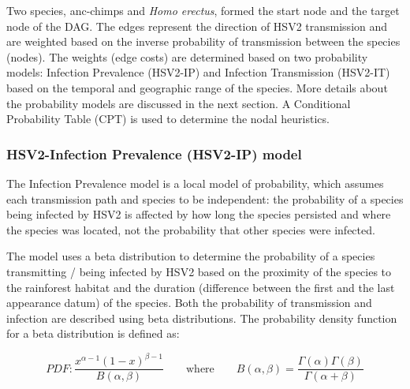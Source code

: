 \documentclass[fleqn,10pt]{wlscirep}
\begin{document}
Two species, anc-chimps and \textit{Homo erectus}, formed the start node and the target node of the DAG. The edges represent the direction of HSV2 transmission and are weighted based on the inverse probability of transmission between the species (nodes). The weights (edge costs) are determined based on two probability models: Infection Prevalence (HSV2-IP) and Infection Transmission (HSV2-IT) based on the temporal and geographic range of the species. More details about the probability models are discussed in the next section. A Conditional Probability Table (CPT) is used to determine the nodal heuristics.
 

\subsubsection*{HSV2-Infection Prevalence (HSV2-IP) model}
The Infection Prevalence model is a local model of probability, which assumes each transmission path and species to be independent: the probability of a species being infected by HSV2 is affected by how long the species persisted and where the species was located, not the probability that other species were infected. 

The model uses a beta distribution to determine the probability of a species transmitting / being infected by HSV2 based on the proximity of the species to the rainforest habitat and the duration (difference between the first and the last appearance datum) of the species. Both the probability of transmission and infection are described using beta distributions. The probability density function for a beta distribution is defined as:  

\begin{equation}
PDF: \frac{x^{\alpha - 1}(1 - x)^{\beta - 1}}{B(\alpha, \beta)} \qquad \mathrm{where} \qquad B(\alpha, \beta) = \frac{\Gamma(\alpha)\Gamma(\beta)}{\Gamma(\alpha + \beta)}
\end{equation}
\end{document}
